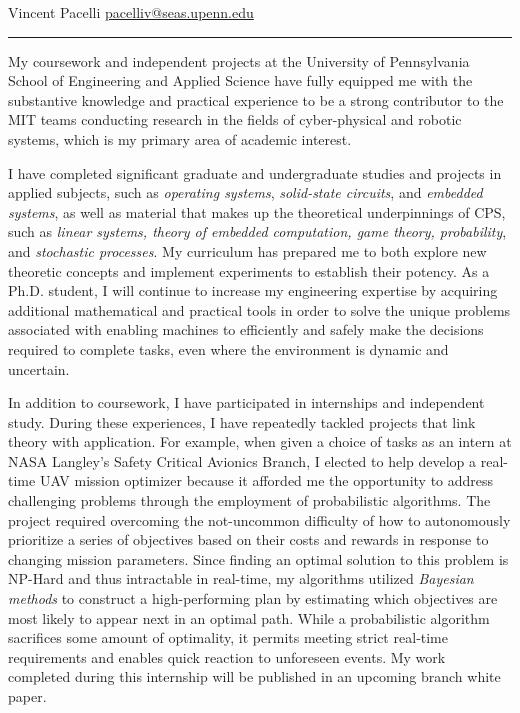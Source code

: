 \documentclass[11pt]{letter}
\title{}
\author{}
\begin{document}
\newcommand{\comm}[1]{}

Vincent Pacelli \hfill \hfill \href{mailto:pacelliv@seas.upenn.edu}{pacelliv@seas.upenn.edu}\\
\rule{\textwidth}{0.1pt}

My coursework and independent projects at the University of Pennsylvania School of Engineering and Applied Science have fully equipped me with the substantive knowledge and practical experience to be a strong contributor to the MIT teams conducting research in the fields of cyber-physical and robotic systems, which is my primary area of academic interest.

I have completed significant graduate and undergraduate studies and projects in applied subjects, such as \emph{operating systems}, \emph{solid-state circuits}, and \emph{embedded systems}, as well as material that makes up the theoretical underpinnings of CPS, such as \emph{linear systems, theory of embedded computation, game theory, probability}, and \emph{stochastic processes}.  My curriculum has prepared me to both explore new theoretic concepts and implement experiments to establish their potency.  As a Ph.D. student, I will continue to increase my engineering expertise by acquiring additional mathematical and practical tools in order to solve the unique problems associated with enabling machines to efficiently and safely make the decisions required to complete tasks, even where the environment is dynamic and uncertain.

In addition to coursework, I have participated in internships and independent study. During these experiences, I have repeatedly tackled projects that link theory with application. For example, when given a choice of tasks as an intern at NASA Langley's Safety Critical Avionics Branch, I elected to help develop a real-time UAV mission optimizer because it afforded me the opportunity to address challenging problems through the employment of probabilistic algorithms. The project required overcoming the not-uncommon difficulty of how to autonomously prioritize a series of objectives based on their costs and rewards in response to changing mission parameters. Since finding an optimal solution to this problem is NP-Hard and thus intractable in real-time, my algorithms utilized \emph{Bayesian methods} to construct a high-performing plan by estimating which objectives are most likely to appear next in an optimal path.  While a probabilistic algorithm sacrifices some amount of optimality, it permits meeting strict real‑time requirements and enables quick reaction to unforeseen events.  My work completed during this internship will be published in an upcoming branch white paper.
\end{document}
